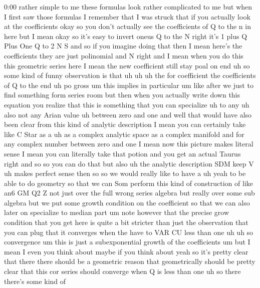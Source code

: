 \begin{unfinished}{0:00}
rather  simple  to  me  these  formulas  look
rather  complicated  to
me
but  when  I  first  saw  those  formulas  I
remember  that  I  was  struck  that  if  you
actually  look  at  the  coefficients  okay
so  you  don't  actually  see  the
coefficients  of  Q  to  the  n  in  here  but  I
mean  okay  so  it's  easy  to  invert  oneus  Q
to  the  N  right  it's  1  plus  Q  Plus  One  Q
to  2  N  S  and  so  if  you  imagine  doing
that
then  I  mean  here's  the  coefficients  they
are  just  polinomial  and  N  right  and  I
mean  when  you  do  this  this  geometric
series  here  I  mean  the  new  coefficient
still  stay  poal  on  end  uh  so  some  kind
of  funny  observation  is
that
uh
uh  uh  the  for  coefficient  the
coefficients
of  Q  to  the
end  uh  po
gross  um  this  implies  in
particular
um  like  after  we  just  to  find  something
form  series  room  but  then  when  you
actually  write  down  this  equation  you
realize  that  this  is  something  that  you
can  specialize  uh  to
any
uh  also  not  any  Arian  value  uh  between
zero  and  one  and  well  that  would  have
also  been  clear  from  this  kind  of
analytic  description  I  mean  you  can
certainly  take  like  C  Star  as  a  uh  as  a
complex  analytic  space  as  a  complex
manifold  and  for  any  complex  number
between  zero  and  one  I  mean  now  this
picture  makes  literal  sense  I  mean  you
can  literally  take  that  potion  and  you
get  an  actual  Taurus  right  and
so  so  you  can  do  that  but  also  uh  the
analytic
description
SDM  keep  V
uh  makes  perfect  sense
then
so  so  we  would  really  like  to  have
a
uh  yeah  to  be  able  to  do  geometry  so
that  we  can  Som  perform  this  kind  of
construction  of  like  an6  GM  Q2  Z  not
just  over  the  full  wrong  series  algebra
but  really  over  some  sub  algebra  but  we
put  some  growth  condition  on  the
coefficient  so  that  we  can  also  later  on
specialize  to  median  part  um  note
however  that  the  precise  grow  condition
that  you  get  here  is  quite  a  bit
stricter  than  just  the  observation  that
you  can  plug  that  it  converges  when  the
have  to  VAR  CU  less  than  one
uh
uh  so
convergence
um  this  is  just  a  subexponential  growth
of  the
coefficients
um  but  I  mean  I  even  you  think  about
maybe
if  you  think  about
yeah  so  it's  pretty  clear  that  there
there  should  be  a  geometric  reason  that
geometrically  should  be  pretty  clear
that  this  cor  series  should  converge
when  Q  is  less  than
one  uh  so  there  there's  some  kind  of

\end{unfinished}
